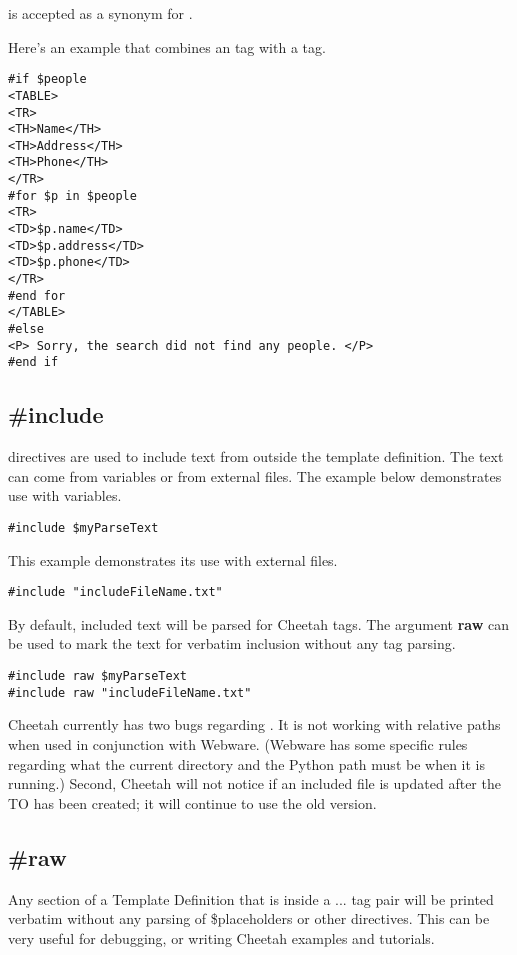 { is accepted as a synonym for {\elif}.

Here's an example that combines an  tag with a  tag.

\begin{verbatim}
#if $people
<TABLE>
<TR>
<TH>Name</TH>
<TH>Address</TH>
<TH>Phone</TH>
</TR>
#for $p in $people
<TR>
<TD>$p.name</TD>
<TD>$p.address</TD>
<TD>$p.phone</TD>
</TR>
#end for
</TABLE>
#else
<P> Sorry, the search did not find any people. </P>
#end if
\end{verbatim}



\subsection{\#include}

 directives are used to include text from outside the template
definition.  The text can come from  variables or from
external files.  The example below demonstrates use with 
variables.

\begin{verbatim}
#include $myParseText
\end{verbatim}

This example demonstrates its use with external files.
\begin{verbatim}
#include "includeFileName.txt"
\end{verbatim}

By default, included text will be parsed for Cheetah tags.  The argument
{\bf raw} can be used to mark the text for verbatim inclusion without any tag
parsing.

\begin{verbatim}
#include raw $myParseText
#include raw "includeFileName.txt"
\end{verbatim}

Cheetah currently has two bugs regarding .  It is not working
with relative paths when used in conjunction with Webware.  (Webware has some
specific rules regarding what the current directory and the Python path must be
when it is running.)  Second, Cheetah will not notice if an included file is
updated after the TO has been created; it will continue to use the old version.

\subsection{\#raw}
Any section of a Template Definition that is inside a  ...
 tag pair will be printed verbatim without any parsing of
\$placeholders or other directives.  This can be very useful for debugging, or
writing Cheetah examples and tutorials.


}
